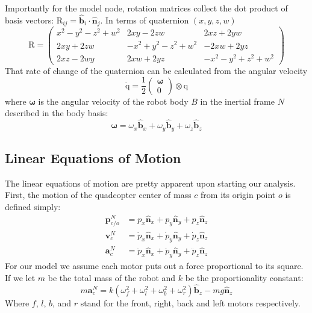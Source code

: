\documentclass[lettersize,journal]{IEEEtran}
\begin{document}
Importantly for the model node, rotation matrices collect the dot product of basis vectors: $\mathrm{R}_{ij} = \mathbf{\hat{b}}_i \cdot \mathbf{\hat{n}}_j$. In terms of quaternion $(x, y, z, w)$
\begin{equation}
	\mathrm{R}=\left(
	\begin{smallmatrix}
		x^2-y^2-z^2+w^2 & 2xy-2zw & 2xz+2yw \\
    2xy+2zw & -x^2+y^2-z^2+w^2 & -2xw+2yz \\
    2xz-2wy & 2xw+2yz & -x^2-y^2+z^2+w^2
	\end{smallmatrix} 
	\right) \label{EQN:RotationMatrix}
\end{equation}
That rate of change of the quaternion can be calculated from the angular velocity
\begin{equation}
	\mathrm{\dot{q}} = \frac{1}{2}
	\begin{pmatrix}
	  \boldsymbol\omega \\
		0
	\end{pmatrix}
	\otimes \mathrm{q} \label{EQN:QuaternionVelocity}
\end{equation}
where $\boldsymbol\omega$ is the angular velocity of the robot body $B$ in the inertial frame $N$ described in the body basis:
\begin{equation}
	\boldsymbol\omega = \omega_x \mathbf{\hat{b}}_x + \omega_y \mathbf{\hat{b}}_y + \omega_z \mathbf{\hat{b}}_z \label{EQN:AngularVelocity}
\end{equation}
\subsection{Linear Equations of Motion}
The linear equations of motion are pretty apparent upon starting our analysis. First, the motion of the quadcopter center of mass $c$ from its origin point $o$ is defined simply:
\begin{align}
  \mathbf{p}^N_{c/o} &= p_x \mathbf{\hat{n}}_x + p_y \mathbf{\hat{n}}_y + p_z \mathbf{\hat{n}}_z \\
  \mathbf{v}^N_c &= \dot{p}_x \mathbf{\hat{n}}_x + \dot{p}_y \mathbf{\hat{n}}_y + \dot{p}_z \mathbf{\hat{n}}_z \\
  \mathbf{a}^N_c &= \ddot{p}_x \mathbf{\hat{n}}_x + \ddot{p}_y \mathbf{\hat{n}}_y + \ddot{p}_z \mathbf{\hat{n}}_z
\end{align}
For our model we assume each motor puts out a force proportional to its square.
If we let $m$ be the total mass of the robot and $k$ be the proportionality constant:
\begin{equation}
  m\mathbf{a}^N_c = k \left(\omega_f^2 + \omega_l^2 + \omega_b^2 + \omega_r^2\right) \mathbf{\hat{b}}_z - mg \mathbf{\hat{n}}_z \label{EQN:LinearEOM}
\end{equation}
Where $f$, $l$, $b$, and $r$ stand for the front, right, back and left motors respectively. 
\end{document}
